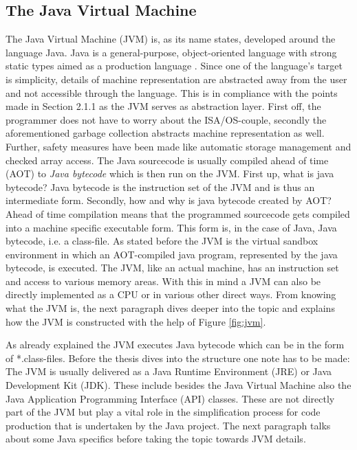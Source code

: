 \subsection{The Java Virtual Machine}
\label{sec:JVM}
The Java Virtual Machine (JVM) is, as its name states, developed around the language Java. Java is a general-purpose, object-oriented language with strong static types aimed as a production language \cite{Gosling}. Since one of the language's target is simplicity, details of machine representation are abstracted away from the user and not accessible through the language. This is in compliance with the points made in Section 2.1.1 as the JVM serves as abstraction layer. First off, the programmer does not have to worry about the ISA/OS-couple, secondly the aforementioned garbage collection abstracts machine representation as well. Further, safety measures have been made like automatic storage management and checked array access. The Java sourcecode is usually compiled ahead of time (AOT) to \emph{Java bytecode} which is then run on the JVM. First up, what is java bytecode? Java bytecode is the instruction set of the JVM and is thus an intermediate form. Secondly, how and why is java bytecode created by AOT? Ahead of time compilation means that the programmed sourcecode gets compiled into a machine specific executable form. This form is, in the case of Java, Java bytecode, i.e. a class-file\cite{Gosling}. As stated before the JVM is the virtual sandbox environment in which an AOT-compiled java program, represented by the java bytecode, is executed. The JVM, like an actual machine, has an instruction set and access to various memory areas. With this in mind a JVM can also be directly implemented as a CPU or in various other direct ways. From knowing what the JVM is, the next paragraph dives deeper into the topic and explains how the JVM is constructed with the help of Figure \ref{fig:jvm}.

As already explained the JVM executes Java bytecode which can be in the form of *.class-files. Before the thesis dives into the structure one note has to be made: The JVM is usually delivered as a Java Runtime Environment (JRE) or Java Development Kit (JDK). These include besides the Java Virtual Machine also the Java Application Programming Interface (API) classes. These are not directly part of the JVM but play a vital role in the simplification process for code production that is undertaken by the Java project. The next paragraph talks about some Java specifics before taking the topic towards JVM details.

